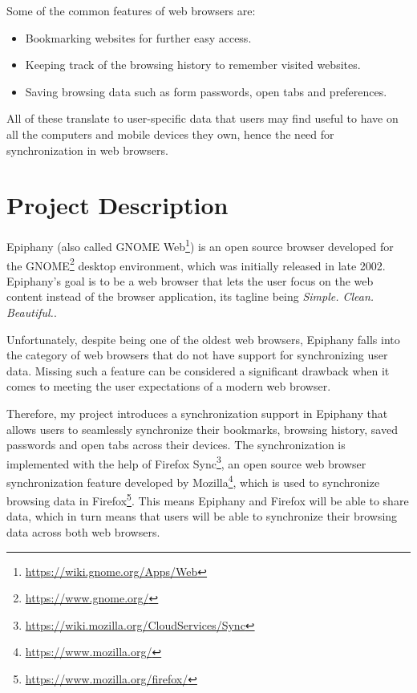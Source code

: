 Some of the common features of web browsers are:
\begin{itemize}
  \item Bookmarking websites for further easy access.
  \item Keeping track of the browsing history to remember visited websites.
  \item Saving browsing data such as form passwords, open tabs and preferences.
\end{itemize}

All of these translate to user-specific data that users may find useful to have on all the computers and mobile devices they own, hence the need for synchronization in web browsers.

\section{Project Description}
\label{sec:project-description}

Epiphany (also called GNOME Web\footnote{\url{https://wiki.gnome.org/Apps/Web}}) is an open source browser developed for the GNOME\footnote{\url{https://www.gnome.org/}} desktop environment, which was initially released in late 2002. Epiphany's goal is to be a web browser that lets the user focus on the web content instead of the browser application, its tagline being \textit{Simple. Clean. Beautiful.}.

Unfortunately, despite being one of the oldest web browsers, Epiphany falls into the category of web browsers that do not have support for synchronizing user data. Missing such a feature can be considered a significant drawback when it comes to meeting the user expectations of a modern web browser.

Therefore, my project introduces a synchronization support in Epiphany that allows users to seamlessly synchronize their bookmarks, browsing history, saved passwords and open tabs across their devices. The synchronization is implemented with the help of Firefox Sync\footnote{\url{https://wiki.mozilla.org/CloudServices/Sync}}, an open source web browser synchronization feature developed by Mozilla\footnote{\url{https://www.mozilla.org/}}, which is used to synchronize browsing data in Firefox\footnote{\url{https://www.mozilla.org/firefox/}}. This means Epiphany and Firefox will be able to share data, which in turn means that users will be able to synchronize their browsing data across both web browsers.
